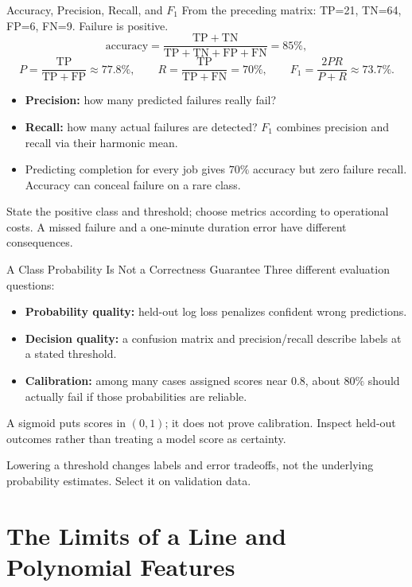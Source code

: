 \documentclass[aspectratio=169,10pt]{beamer}
\begin{document}
\begin{frame}{Accuracy, Precision, Recall, and $F_1$}
  \small
  From the preceding matrix: TP=21, TN=64, FP=6, FN=9. Failure is positive.
  \[
    \text{accuracy}=\frac{\mathrm{TP}+\mathrm{TN}}{\mathrm{TP}+\mathrm{TN}+\mathrm{FP}+\mathrm{FN}}=85\%,
  \]
  \[
    P=\frac{\mathrm{TP}}{\mathrm{TP}+\mathrm{FP}}\approx77.8\%,\qquad
    R=\frac{\mathrm{TP}}{\mathrm{TP}+\mathrm{FN}}=70\%,\qquad
    F_1=\frac{2PR}{P+R}\approx73.7\%.
  \]
  \begin{itemize}
    \item \textbf{Precision:} how many predicted failures really fail?
    \item \textbf{Recall:} how many actual failures are detected? $F_1$ combines precision and recall via their harmonic mean.
    \item Predicting completion for every job gives $70\%$ accuracy but zero failure recall. Accuracy can conceal failure on a rare class.
  \end{itemize}
  State the positive class and threshold; choose metrics according to operational costs. A missed failure and a one-minute duration error have different consequences.
\end{frame}

\begin{frame}{A Class Probability Is Not a Correctness Guarantee}
  \small
  Three different evaluation questions:
  \begin{itemize}
    \item \textbf{Probability quality:} held-out log loss penalizes confident wrong predictions.
    \item \textbf{Decision quality:} a confusion matrix and precision/recall describe labels at a stated threshold.
    \item \textbf{Calibration:} among many cases assigned scores near $0.8$, about $80\%$ should actually fail if those probabilities are reliable.
  \end{itemize}
  \begin{keyidea}
    A sigmoid puts scores in $(0,1)$; it does not prove calibration. Inspect held-out outcomes rather than treating a model score as certainty.
  \end{keyidea}
  Lowering a threshold changes labels and error tradeoffs, not the underlying probability estimates. Select it on validation data.
\end{frame}

\section{The Limits of a Line and Polynomial Features}
\end{document}
